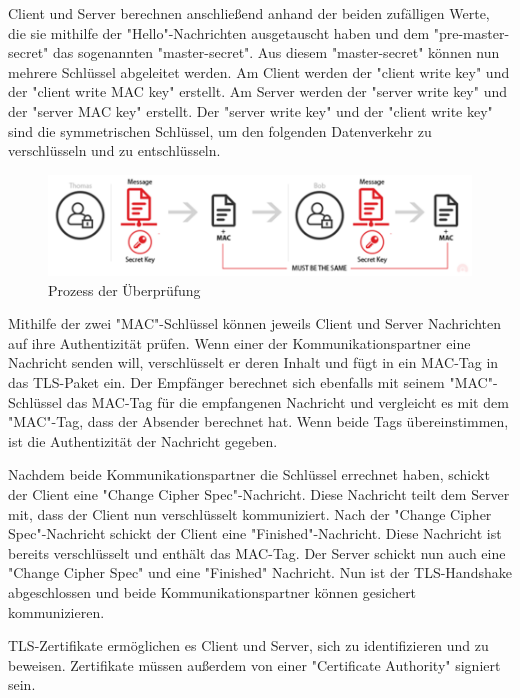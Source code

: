 Client und Server berechnen anschließend anhand der beiden zufälligen Werte, die sie mithilfe der "Hello"-Nachrichten ausgetauscht haben und dem "pre-master-secret" das sogenannten "master-secret". Aus diesem "master-secret" können nun mehrere Schlüssel abgeleitet werden. Am Client werden der "client write key" und der "client write MAC key" erstellt. Am Server werden der "server write key" und der "server MAC key" erstellt. Der "server write key" und der "client write key" sind die symmetrischen Schlüssel, um den folgenden Datenverkehr zu verschlüsseln und zu entschlüsseln. \cite{WikiTLS}

\begin{figure}[H]
    \centering
    \includegraphics{media/OpenSSL/key.png}
    \caption{Prozess der Überprüfung \cite{TerminologyTLS}} 
\end{figure}

Mithilfe der zwei "MAC"-Schlüssel können jeweils Client und Server Nachrichten auf ihre Authentizität prüfen. Wenn einer der Kommunikationspartner eine Nachricht senden will, verschlüsselt er deren Inhalt und fügt in ein MAC-Tag in das TLS-Paket ein. Der Empfänger berechnet sich ebenfalls mit seinem "MAC"-Schlüssel das MAC-Tag für die empfangenen Nachricht und vergleicht es mit dem "MAC"-Tag, dass der Absender berechnet hat. Wenn beide Tags übereinstimmen, ist die Authentizität der Nachricht gegeben.

Nachdem beide Kommunikationspartner die Schlüssel errechnet haben, schickt der Client eine "Change Cipher Spec"-Nachricht. Diese Nachricht teilt dem Server mit, dass der Client nun verschlüsselt kommuniziert. Nach der "Change Cipher Spec"-Nachricht schickt der Client eine "Finished"-Nachricht. Diese Nachricht ist bereits verschlüsselt und enthält das MAC-Tag. Der Server schickt nun auch eine "Change Cipher Spec" und eine "Finished" Nachricht. Nun ist der TLS-Handshake abgeschlossen und beide Kommunikationspartner können gesichert kommunizieren. \cite{SessionKeyTLS}


TLS-Zertifikate ermöglichen es Client und Server, sich zu identifizieren und zu beweisen. Zertifikate müssen außerdem von einer "Certificate Authority" signiert sein. 

